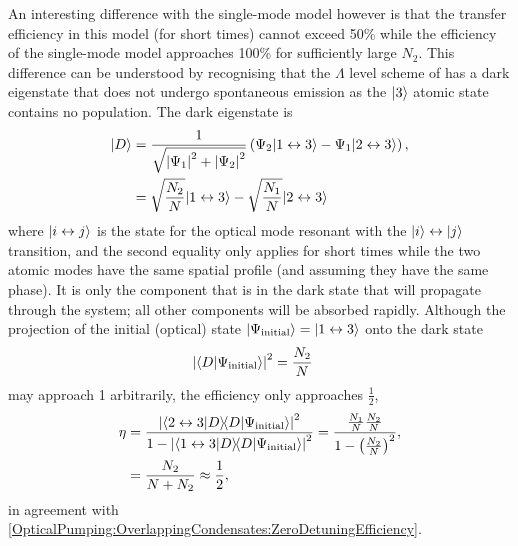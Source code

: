 An interesting difference with the single-mode model however is that the transfer efficiency in this model (for short times) cannot exceed 50\% while the efficiency of the single-mode model approaches 100\% for sufficiently large $N_2$.  This difference can be understood by recognising that the $\Lambda$ level scheme of  has a dark eigenstate that does not undergo spontaneous emission as the ${\left|3\right>}$ atomic state contains no population.  The dark eigenstate is
\begin{align}
    \ket{D} &= \frac{1}{\sqrt{\abs{\Psi_1}^2 + \abs{\Psi_2}^2}} \left(\Psi_2 \ket{1 \leftrightarrow 3}- \Psi_1 \ket{2\leftrightarrow 3}\right), \label{OpticalPumping:DarkState}\\
    &= \sqrt{\frac{N_2}{N}} \ket{1 \leftrightarrow 3} - \sqrt{\frac{N_1}{N}} \ket{2 \leftrightarrow 3}
\end{align}
where ${\left|i \leftrightarrow j\right>}$ is the state for the optical mode resonant with the ${\left|i\right>} \leftrightarrow {\ensuremath{\left|j\right>}}$ transition, and the second equality only applies for short times while the two atomic modes have the same spatial profile (and assuming they have the same phase).  It is only the component that is in the dark state that will propagate through the system; all other components will be absorbed rapidly.  Although the projection of the initial (optical) state ${\left|\Psi_\text{initial}\right>} = {\left|1 \leftrightarrow 3\right>}$ onto the dark state
\begin{align}
    \left|\left<D\middle|\Psi_\text{initial}\right>\right|^2 &= \frac{N_2}{N}
\end{align}
may approach 1 arbitrarily, the efficiency only approaches $\frac{1}{2}$,
\begin{align}
    \eta &= \frac{\left|\left<2 \leftrightarrow 3\middle|D\right> \!\!\left<D\middle|\Psi_\text{initial}\right>\right|^2}{1 - \left|\left<1 \leftrightarrow 3\middle|D\right> \!\! \left<D\middle|\Psi_\text{initial}\right>\right|^2} = \frac{\frac{N_1}{N} \frac{N_2}{N}}{1 - \left(\frac{N_2}{N}\right)^2}, \\
    &= \frac{N_2}{N + N_2} \approx \frac{1}{2},
\end{align}
in agreement with \eqref{OpticalPumping:OverlappingCondensates:ZeroDetuningEfficiency}.

